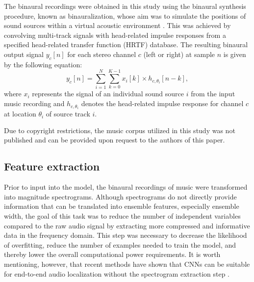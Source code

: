 \documentclass{article}
\begin{document}
The binaural recordings were obtained in this study using the binaural synthesis procedure, known as binauralization, whose aim was to simulate the positions of sound sources within a virtual acoustic environment \parencite{blauert_spatial_1996}. This was achieved by convolving multi-track signals with head-related impulse responses from a specified head-related transfer function (HRTF) database. The resulting binaural output signal $y_c[n]$ for each stereo channel $c$ (left or right) at sample $n$ is given by the following equation:
\begin{equation}
  y_c[n] = \sum_{i=1}^{N} \sum_{k=0}^{K-1} x_i[k] \times h_{c,\theta_i}[n-k] ,
\end{equation}
where $x_i$ represents the signal of an individual sound source $i$ from the input music recording and $h_{c,\theta_i}$ denotes the head-related impulse response for channel $c$ at location $\theta_i$ of source track $i$.

Due to copyright restrictions, the music corpus utilized in this study was not published and can be provided upon request to the authors of this paper.

\subsection{Feature extraction}
\label{subsec:feature_extraction}


Prior to input into the model, the binaural recordings of music were transformed into magnitude spectrograms. Although spectrograms do not directly provide information that can be translated into ensemble features, especially ensemble width, the goal of this task was to reduce the number of independent variables compared to the raw audio signal by extracting more compressed and informative data in the frequency domain. This step was necessary to decrease the likelihood of overfitting, reduce the number of examples needed to train the model, and thereby lower the overall computational power requirements. It is worth mentioning, however, that recent methods have shown that CNNs can be suitable for end-to-end audio localization without the spectrogram extraction step \parencite{vera-diaz_towards_2018, vecchiotti_end--end_2019}.
\end{document}
